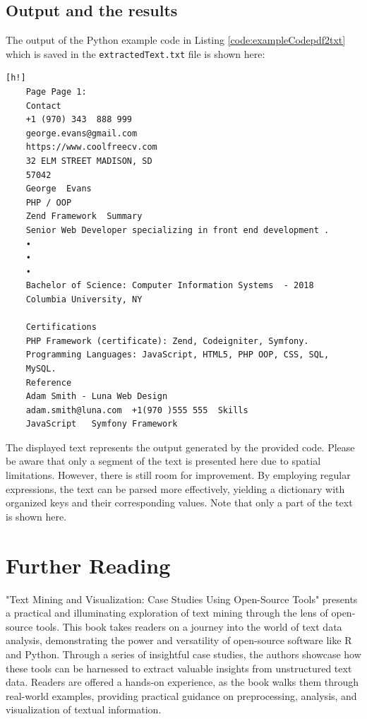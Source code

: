 \subsection{Output and the results}

The output of the Python example code in Listing \ref{code:exampleCodepdf2txt} which is saved in the \texttt{extractedText.txt} file is shown here:

\begin{verbatim}[h!]
	Page Page 1:
	Contact  
	+1 (970) 343  888 999 
	george.evans@gmail.com  
	https://www.coolfreecv.com  
	32 ELM STREET MADISON, SD 
	57042  
	George  Evans  
	PHP / OOP   
	Zend Framework  Summary  
	Senior Web Developer specializing in front end development . 
	•
	•
	•   
	Bachelor of Science: Computer Information Systems  - 2018  
	Columbia University, NY  
	
	Certifications  
	PHP Framework (certificate): Zend, Codeigniter, Symfony. 
	Programming Languages: JavaScript, HTML5, PHP OOP, CSS, SQL, 
	MySQL.  
	Reference  
	Adam Smith - Luna Web Design  
	adam.smith@luna.com  +1(970 )555 555  Skills   
	JavaScript   Symfony Framework
\end{verbatim}

The displayed text represents the output generated by the provided code. Please be aware that only a segment of the text is presented here due to spatial limitations. However, there is still room for improvement. By employing regular expressions, the text can be parsed more effectively, yielding a dictionary with organized keys and their corresponding values. Note that only a part of the text is shown here.


\section{Further Reading}

"Text Mining and Visualization: Case Studies Using Open-Source Tools" \cite{Hofmann:2016} presents a practical and illuminating exploration of text mining through the lens of open-source tools. This book takes readers on a journey into the world of text data analysis, demonstrating the power and versatility of open-source software like R and Python. Through a series of insightful case studies, the authors showcase how these tools can be harnessed to extract valuable insights from unstructured text data. Readers are offered a hands-on experience, as the book walks them through real-world examples, providing practical guidance on preprocessing, analysis, and visualization of textual information.

